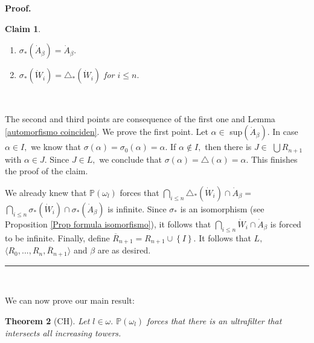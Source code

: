 \documentclass{article}%
\newtheorem{theorem}{Theorem}
\newtheorem{claim}[theorem]{Claim}
\newenvironment{proof}[1][Proof]{\noindent\textbf{#1.} }{\ \rule{0.5em}{0.5em}}
\begin{document}
\begin{proof}
\begin{claim}
\begin{enumerate}
\item $\sigma_{\ast}(\dot{A}_{\beta})=\dot{A}_{\beta}.$

\item $\sigma_{\ast}(\dot{W}_{i})=\triangle_{\ast}(\dot{W}_{i})$ for $i\leq
n.$
\end{enumerate}
\end{claim}

\qquad\ \ 

The second and third points are consequence of the first one and Lemma
\ref{automorfismo coinciden}. We prove the first point. Let $\alpha\in$
\textsf{sup}$(\dot{A}_{\beta}).$ In case $\alpha\in I,$ we know that
$\sigma\left(  \alpha\right)  =\sigma_{0}\left(  \alpha\right)  =\alpha.$ If
$\alpha\notin I,$ then there is $J\in$ $\bigcup R_{n+1}$ with $\alpha\in J.$
Since $J\in L,$ we conclude that $\sigma\left(  \alpha\right)  =\triangle
\left(  \alpha\right)  =\alpha.$ This finishes the proof of the claim.

\qquad\qquad\qquad

We already knew that $\mathbb{P}\left(  \omega_{l}\right)  $ forces that
$\bigcap\limits_{i\leq n}\triangle_{\ast}(\dot{W}_{i})\cap\dot{A}_{\beta}=$
$\bigcap\limits_{i\leq n}\sigma_{\ast}(\dot{W}_{i})\cap\sigma_{\ast}(\dot
{A}_{\beta})$ is infinite. Since $\sigma_{\ast}$ is an isomorphism (see
Proposition \ref{Prop formula isomorfismo}), it follows that $\bigcap
\limits_{i\leq n}\dot{W}_{i}\cap\dot{A}_{\beta}$ is forced to be infinite.
Finally, define $\overline{R}_{n+1}=R_{n+1}\cup\left\{  I\right\}  .$ It
follows that $L,$ $\langle R_{0},...,R_{n},\overline{R}_{n+1}\rangle$ and
$\beta$ are as desired.
\end{proof}

\qquad\ \ \qquad\ \ 

We can now prove our main result:

\begin{theorem}
[\textsf{CH}]Let $l\in\omega.$ $\mathbb{P}\left(  \omega_{l}\right)  $ forces
that there is an ultrafilter that intersects all increasing towers.
\label{Teorema ultrafiltro torre}
\end{theorem}
\end{document}
